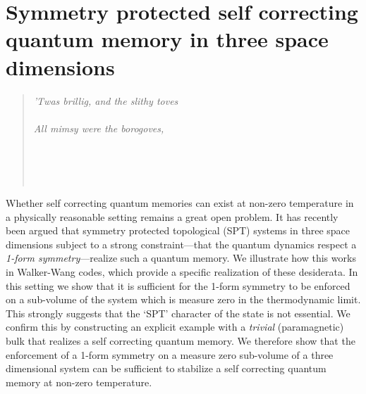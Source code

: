 
\chapter{Symmetry protected self correcting quantum memory in three space dimensions} \label{chp:WalkerWang}

\vspace{-.35in}
\begin{quotation}
\begin{multicols}{2}
	\noindent \textit{'Twas brillig, and the slithy toves \\
	 \\
	\noindent All mimsy were the borogoves, \\
	}
	 

\raggedleft 
	\\
	\\
	\\
\end{multicols}

\end{quotation}
	
Whether self correcting quantum memories can exist at non-zero temperature in a physically reasonable setting remains a great open problem. It has recently been argued \cite{RobertsBartlett2020} that symmetry protected topological (SPT) systems in three space dimensions subject to a strong constraint---that the quantum dynamics respect a {\it 1-form symmetry}---realize such a quantum memory. We illustrate how this works in Walker-Wang codes, which provide a specific realization of these desiderata. In this setting we show that it is sufficient for the 1-form symmetry to be enforced on a sub-volume of the system which is measure zero in the thermodynamic limit. This strongly suggests that the `SPT' character of the state is not essential. We confirm this by constructing an explicit example with a {\it trivial} (paramagnetic) bulk that realizes a self correcting quantum memory. We therefore show that the enforcement of a 1-form symmetry on a measure zero sub-volume of a three dimensional system can be sufficient to stabilize a self correcting quantum memory at non-zero temperature. 

